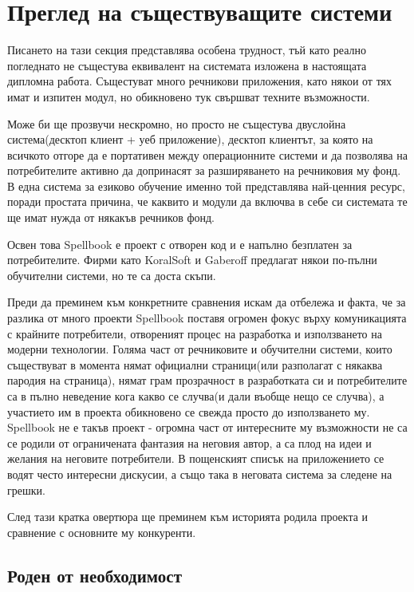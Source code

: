 \section{Преглед на съществуващите системи}

Писането на тази секция представлява особена трудност, тъй като реално
погледнато не същестува еквивалент на системата изложена в настоящата
дипломна работа. Същестуват много речникови приложения, като някои от
тях имат и изпитен модул, но обикновено тук свършват техните
възможности. 

Може би ще прозвучи нескромно, но просто не същестува двуслойна
система(десктоп клиент + уеб приложение), десктоп клиентът, за която
на всичкото отгоре да е портативен между операционните системи и да
позволява на потребителите активно да допринасят за разширяването на
речниковия му фонд. В една система за езиково обучение именно той
представлява най-ценния ресурс, поради простата причина, че каквито и
модули да включва в себе си системата те ще имат нужда от някакъв
речников фонд.

Освен това Spellbook е проект с отворен код и е напълно безплатен за
потребителите. Фирми като KoralSoft и Gaberoff предлагат някои
по-пълни обучителни системи, но те са доста скъпи.

Преди да преминем към конкретните сравнения искам да отбележа и факта,
че за разлика от много проекти Spellbook поставя огромен фокус върху
комуникацията с крайните потребители, отвореният процес на разработка
и използването на модерни технологии. Голяма част от речниковите и
обучителни системи, които съществуват в момента нямат официални
страници(или разполагат с някаква пародия на страница), нямат грам
прозрачност в разработката си и потребителите са в пълно неведение
кога какво се случва(и дали въобще нещо се случва), а участието им в
проекта обикновено се свежда просто до използването му. Spellbook не е
такъв проект - огромна част от интересните му възможности не са се
родили от ограничената фантазия на неговия автор, а са плод на идеи и
желания на неговите потребители. В пощенският списък на приложението
се водят често интересни дискусии, а също така в неговата система за
следене на грешки.

След тази кратка овертюра ще преминем към историята родила проекта и
сравнение с основните му конкуренти.
\subsection{Роден от необходимост}

